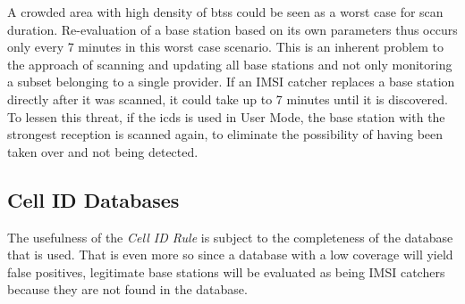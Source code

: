 A crowded area with high density of \glspl{bts} could be seen as a worst case for scan duration.
Re-evaluation of a base station based on its own parameters thus occurs only every 7 minutes in this worst case scenario.
This is an inherent problem to the approach of scanning and updating all base stations and not only monitoring a subset belonging to a single provider.
If an IMSI catcher replaces a base station directly after it was scanned, it could take up to 7 minutes until it is discovered.
To lessen this threat, if the \gls{icds} is used in User Mode, the base station with the strongest reception is scanned again, to eliminate the possibility of having been taken over and not being detected.

\subsection{Cell ID Databases}
The usefulness of the \emph{Cell ID Rule} is subject to the completeness of the database that is used.
That is even more so since a database with a low coverage will yield false positives, \eg legitimate base stations will be evaluated as being IMSI catchers because they are not found in the database.

